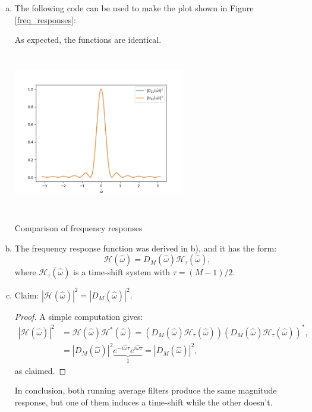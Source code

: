 \begin{enumerate}
\begin{enumerate}[a)]
\item The following code can be used to make the plot shown in Figure \ref{freq_responses}:


As expected, the functions are identical. 
\begin{marginfigure}
    \includegraphics[height=7.0cm,width=7.5cm]{ch11/figures/frequency_responses.png}
    \caption{Comparison of frequency responses}
    \label{freq_responses}
\end{marginfigure}

\item The frequency response function was derived in b), and it has the form:
$$\mathcal{H}(\hat{\omega})=D_{M}(\hat{\omega})\mathcal{H}_{\tau}(\hat{\omega}),$$
where $\mathcal{H}_{\tau}(\hat{\omega})$ is a time-shift system with $\tau=(M-1)/2$. 

\item Claim: $|\mathcal{H}(\hat{\omega})|^{2}=|D_{M}(\hat{\omega})|^{2}$.
\begin{proof}
A simple computation gives:
\begin{align*}
    |\mathcal{H}(\hat{\omega})|^{2}&=\mathcal{H}(\hat{\omega})\mathcal{H}^{*}(\hat{\omega})=(D_{M}(\hat{\omega})\mathcal{H}_{\tau}(\hat{\omega}))(D_{M}(\hat{\omega})\mathcal{H}_{\tau}(\hat{\omega}))^{*},\\
    &=|D_{M}(\hat{\omega})|^{2}\underbrace{e^{-i\hat{\omega}\tau}e^{i\hat{\omega}\tau}}_{1}=|D_{M}(\hat{\omega})|^{2},
\end{align*}
as claimed. 
\end{proof}
In conclusion, both running average filters produce the same magnitude response, but one of them induces a time-shift while the other doesn't. 
\end{enumerate}


\end{enumerate}
